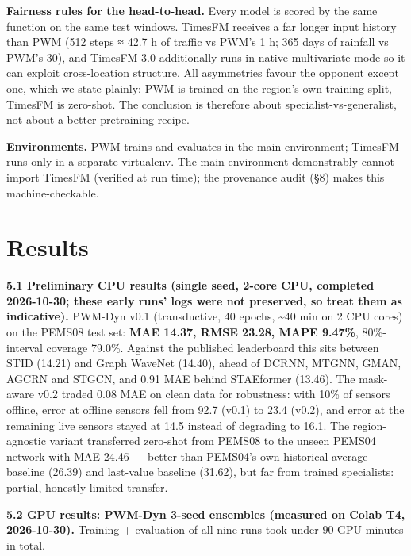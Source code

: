 \documentclass[
  10pt,
]{article}
\begin{document}
\textbf{Fairness rules for the head-to-head.} Every model is scored by
the same function on the same test windows. TimesFM receives a far
longer input history than PWM (512 steps ≈ 42.7 h of traffic vs PWM's 1
h; 365 days of rainfall vs PWM's 30), and TimesFM 3.0 additionally runs
in native multivariate mode so it can exploit cross-location structure.
All asymmetries favour the opponent except one, which we state plainly:
PWM is trained on the region's own training split, TimesFM is zero-shot.
The conclusion is therefore about specialist-vs-generalist, not about a
better pretraining recipe.

\textbf{Environments.} PWM trains and evaluates in the main environment;
TimesFM runs only in a separate virtualenv. The main environment
demonstrably cannot import TimesFM (verified at run time); the
provenance audit (§8) makes this machine-checkable.

\section{Results}

\textbf{5.1 Preliminary CPU results (single seed, 2-core CPU, completed
2026-10-30; these early runs' logs were not preserved, so treat them as indicative).} PWM-Dyn v0.1 (transductive, 40 epochs,
\textasciitilde40 min on 2 CPU cores) on the PEMS08 test set:
\textbf{MAE 14.37, RMSE 23.28, MAPE 9.47\%}, 80\%-interval coverage
79.0\%. Against the published leaderboard this sits between STID (14.21)
and Graph WaveNet (14.40), ahead of DCRNN, MTGNN, GMAN, AGCRN and STGCN,
and 0.91 MAE behind STAEformer (13.46). The mask-aware v0.2 traded 0.08
MAE on clean data for robustness: with 10\% of sensors offline, error at
offline sensors fell from 92.7 (v0.1) to 23.4 (v0.2), and error at the
remaining live sensors stayed at 14.5 instead of degrading to 16.1. The
region-agnostic variant transferred zero-shot from PEMS08 to the unseen
PEMS04 network with MAE 24.46 --- better than PEMS04's own
historical-average baseline (26.39) and last-value baseline (31.62), but
far from trained specialists: partial, honestly limited transfer.

\textbf{5.2 GPU results: PWM-Dyn 3-seed ensembles (measured on Colab T4,
2026-10-30).} Training + evaluation of all nine runs took under 90
GPU-minutes in total.
\end{document}
